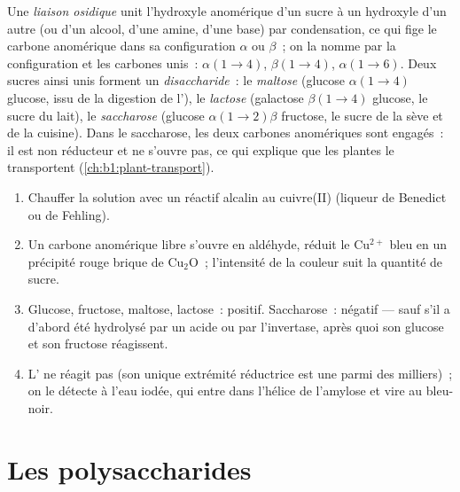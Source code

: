 \begin{definition}\label{def:b1:carbohydrates:glycosidic}
Une \emph{liaison osidique} unit l'hydroxyle
anomérique d'un sucre à un hydroxyle d'un autre (ou d'un alcool, d'une
amine, d'une base) par condensation, ce qui fige le carbone anomérique
dans sa configuration $\alpha$ ou $\beta$~; on la nomme par la
configuration et les carbones unis~: $\alpha(1{\to}4)$,
$\beta(1{\to}4)$, $\alpha(1{\to}6)$. Deux sucres ainsi unis forment un
\emph{disaccharide}~: le \emph{maltose}
(glucose $\alpha(1{\to}4)$ glucose, issu de la digestion de l'),
le \emph{lactose} (galactose $\beta(1{\to}4)$ glucose, le sucre du
lait), le \emph{saccharose} (glucose $\alpha(1{\to}2)\beta$ fructose, le
sucre de la sève et de la cuisine). Dans le saccharose, les deux
carbones anomériques sont engagés~: il est non réducteur et ne s'ouvre
pas, ce qui explique que les plantes le transportent
(\cref{ch:b1:plant-transport}).
\end{definition}

\begin{method}\label{met:b1:carbohydrates:reducing}
\begin{enumerate}
  \item Chauffer la solution avec un réactif alcalin au cuivre(II)
        (liqueur de Benedict ou de Fehling).
  \item Un carbone anomérique libre s'ouvre en aldéhyde, réduit le
        $\mathrm{Cu^{2+}}$ bleu en un précipité rouge brique de
        $\mathrm{Cu_2O}$~; l'intensité de la couleur suit la quantité de
        sucre.
  \item Glucose, fructose, maltose, lactose~: positif. Saccharose~:
        négatif --- sauf s'il a d'abord été hydrolysé par un acide ou
        par l'invertase, après quoi son glucose et son fructose
        réagissent.
  \item L' ne réagit pas (son unique extrémité réductrice est une
        parmi des milliers)~; on le détecte à l'eau iodée, qui entre
        dans l'hélice de l'amylose et vire au bleu-noir.
\end{enumerate}
\end{method}

\section{Les polysaccharides}

